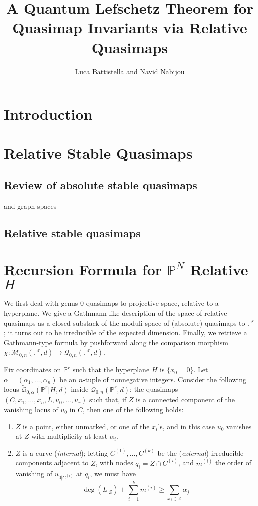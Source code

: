 \documentclass[11pt]{amsart}
\title{A Quantum Lefschetz Theorem for Quasimap Invariants via Relative Quasimaps}
\author{Luca Battistella and Navid Nabijou}
\newcommand{\M}[4]{\overline{\mathcal M}_{#1,#2}(#3,#4)}
\newcommand{\Q}[4]{\overline{\mathcal Q}_{#1,#2}(#3,#4)}
\newcommand{\Qt}[4]{\widetilde{\mathcal Q}_{#1,#2}(#3,#4)}
\newcommand{\PP}{\mathbb P}
\renewcommand{\to}{\rightarrow}
\newcommand{\comp}{\chi}
\theoremstyle{plain}
\theoremstyle{definition}
\begin{document}
\begin{abstract}
\end{abstract}

\maketitle
\appendixtitletocoff
\tableofcontents

\section{Introduction}

\section{Relative Stable Quasimaps}
\subsection{Review of absolute stable quasimaps} and graph spaces
\subsection{Relative stable quasimaps}

\section{Recursion Formula for $\PP^N$ Relative $H$}

We first deal with genus 0 quasimaps to projective space, relative to a hyperplane. We give a Gathmann-like description of the space of relative quasimaps as a closed substack of the moduli space of (absolute) quasimaps to $\PP^r$; it turns out to be irreducible of the expected dimension. Finally, we retrieve a Gathmann-type formula by pushforward along the comparison morphism $\comp\colon \M{0}{n}{\PP^r}{d}\to\Q{0}{n}{\PP^r}{d}$.

Fix coordinates on $\PP^r$ such that the hyperplane $H$ is $\{x_0=0\}$. Let $\alpha=(\alpha_1,\ldots,\alpha_n)$ be an $n$-tuple of nonnegative integers. Consider the following locus $\Qt{0}{\alpha}{\PP^r|H}{d}$ inside $\Q{0}{n}{\PP^r}{d}$: the quasimaps $(C,x_1,\ldots,x_n,L,u_0,\ldots,u_r)$ such that, if $Z$ is a connected component of the vanishing locus of $u_0$ in $C$, then one of the following holds:

\begin{enumerate}
\item $Z$ is a point, either unmarked, or one of the $x_i$'s, and in this case $u_0$ vanishes at $Z$ with multiplicity at least $\alpha_i$.
\item $Z$ is a curve (\emph{internal}); letting $C^{(1)},\ldots,C^{(k)}$ be the (\emph{external}) irreducible components adjacent to $Z$, with nodes $q_i=Z\cap C^{(i)}$, and $m^{(i)}$ the order of vanishing of $u_{0|C^{(i)}}$ at $q_i$, we must have
\[
\deg(L_{|Z})+\sum_{i=1}^k m^{(i)}\geq\sum_{x_j\in Z} \alpha_j
\]
\end{enumerate}
\end{document}
